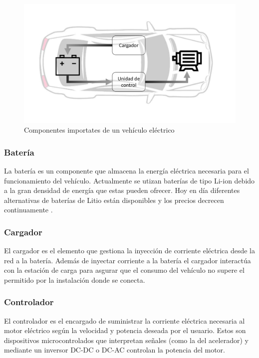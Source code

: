 \begin{figure}[h]
	\centering
	\includegraphics[width=\textwidth]{./Figures/VehiculoElectrico.pdf}
	\caption{Componentes importates de un vehículo eléctrico}
	\label{fig:vehículo_electrico}
\end{figure}

\subsubsection{Batería}
La batería es un componente que almacena la energía eléctrica necesaria para el funcionamiento del vehículo. Actualmente se utizan baterías de tipo Li-ion debido a la gran densidad de energía 
que estas pueden ofrecer. Hoy en día diferentes alternativas de baterías de Litio están disponibles y los precios decrecen continuamente \citep{helmers2012electric}.

\subsubsection{Cargador}
El cargador es el elemento que gestiona la inyección de corriente eléctrica desde la red a la batería. Además de inyectar corriente a la batería el cargador interactúa con 
la estación de carga para asgurar que el consumo del vehículo no supere el permitido por la instalación donde se conecta.

\subsubsection{Controlador}
El controlador es el encargado de suministrar la corriente eléctrica necesaria al motor eléctrico según la velocidad y potencia deseada por el usuario. 
Estos son dispositivos microcontrolados que interpretan señales (como la del acelerador) y mediante un inversor DC-DC o DC-AC controlan la potencia del motor.

